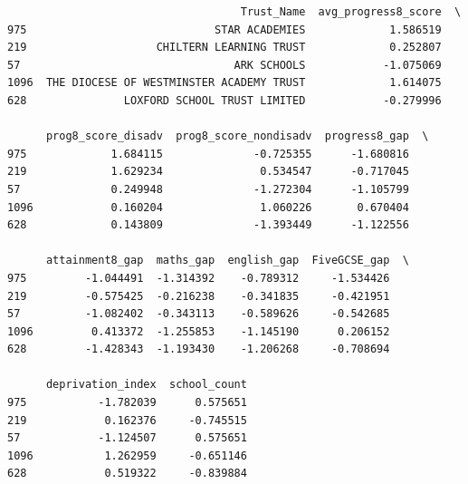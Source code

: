 \documentclass[
  letterpaper,
  DIV=11,
  numbers=noendperiod]{scrartcl}
\begin{document}
\begin{verbatim}
                                    Trust_Name  avg_progress8_score  \
975                             STAR ACADEMIES             1.586519   
219                    CHILTERN LEARNING TRUST             0.252807   
57                                 ARK SCHOOLS            -1.075069   
1096  THE DIOCESE OF WESTMINSTER ACADEMY TRUST             1.614075   
628               LOXFORD SCHOOL TRUST LIMITED            -0.279996   

      prog8_score_disadv  prog8_score_nondisadv  progress8_gap  \
975             1.684115              -0.725355      -1.680816   
219             1.629234               0.534547      -0.717045   
57              0.249948              -1.272304      -1.105799   
1096            0.160204               1.060226       0.670404   
628             0.143809              -1.393449      -1.122556   

      attainment8_gap  maths_gap  english_gap  FiveGCSE_gap  \
975         -1.044491  -1.314392    -0.789312     -1.534426   
219         -0.575425  -0.216238    -0.341835     -0.421951   
57          -1.082402  -0.343113    -0.589626     -0.542685   
1096         0.413372  -1.255853    -1.145190      0.206152   
628         -1.428343  -1.193430    -1.206268     -0.708694   

      deprivation_index  school_count  
975           -1.782039      0.575651  
219            0.162376     -0.745515  
57            -1.124507      0.575651  
1096           1.262959     -0.651146  
628            0.519322     -0.839884  
\end{verbatim}
\end{document}
